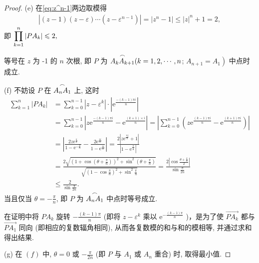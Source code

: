 \begin{proof}
	(e) 在\autoref{eq:z^n-1}两边取模得
	\begin{align*}
		\left|(z-1)(z-\varepsilon) \cdots\left(z-\varepsilon^{n-1}\right)\right|=\left|z^n-1\right| \leqslant|z|^n+1=2,
	\end{align*}
	即 $\displaystyle\prod_{k=1}^n\left|P A_k\right| \leqslant 2,$

	等号在 $z$ 为 -1 的 $n$ 次根, 即 $P$ 为 $\overset{\frown}{{A_k} A_{k+1}}(k=1,2, \cdots, n$; $\left.A_{n+1}=A_1\right)$ 中点时成立.

	(f) 不妨设 $P$ 在 $\overset{\frown}{A_n A_1}$ 上, 这时
	\begin{align*}
		\sum_{k=1}^n\left|P A_k\right| & =\sum_{k=0}^{n-1}\left|z-\varepsilon^k\right| \cdot\left|\mathrm{e}^{\frac{-(k-1) \pi i}{n}}\right|                                                                                                                                                                   \\
		                               & =\sum_{k=0}^{n-1}\left|z \mathrm{e}^{\frac{-(k-1) \pi i}{n}}-\mathrm{e}^{\frac{(k+1) \times i}{n}}\right|=\left|\sum_{k=0}^{n-1}\left(z \mathrm{e}^{\frac{(k-1) \pi i}{n}}-\mathrm{e}^{\frac{(k+1) \pi i}{n}}\right)\right|                                           \\
		                               & =\left|\frac{2 z \mathrm{e}^{\frac{\pi}{n}}}{1-\mathrm{e}^{-\frac{\pi}{n}}}-\frac{2 \mathrm{e}^{\frac{\pi i}{n}}}{1-\mathrm{e}^{\frac{\pi i}{n}}}\right|=\frac{2\left|z \mathrm{e}^{\frac{\pi j}{n}}+1\right|}{\left|1-\mathrm{e}^{\frac{\pi}{\frac{\pi}{n}}}\right|} \\
		                               & =\frac{2 \sqrt{\left(1+\cos \left(\theta+\frac{\pi}{n}\right)\right)^2+\sin ^2\left(\theta+\frac{\pi}{n}\right)}}{\sqrt{\left(1-\cos \frac{\pi}{n}\right)^2+\sin ^2 \frac{\pi}{n}}}=\frac{2\left|\cos \frac{\theta+\frac{\pi}{n}}{2}\right|}{\sin \frac{\pi}{2 n}}    \\
		                               & \leqslant \frac{2}{\sin \frac{\pi}{2 n}} .
	\end{align*}
	当且仅当 $\theta=-\frac{\pi}{n}$, 即 $P$ 为 $\overset{\frown}{A_n A_1}$ 中点时等号成立.

	在证明中将 $P A_k$ 旋转 $-\frac{(k-1) \pi}{n}$ (即将 $z-\varepsilon^k$ 乘以 $\mathrm{e}^{-\frac{(k-1) \pi}{n}}$ )，是为了使 $\overrightarrow{P A_k}$ 都与 $\overrightarrow{P A_1}$ 同向 (即相应的复数辐角相同), 从而各复数模的和与和的模相等, 并通过求和得出结果.

	(g) 在 $(f)$ 中, $\theta=0$ 或 $-\frac{\pi}{2 n}$ (即 $P$ 与 $A_1$ 或 $A_n$ 重合) 时, 取得最小值.
\end{proof}

